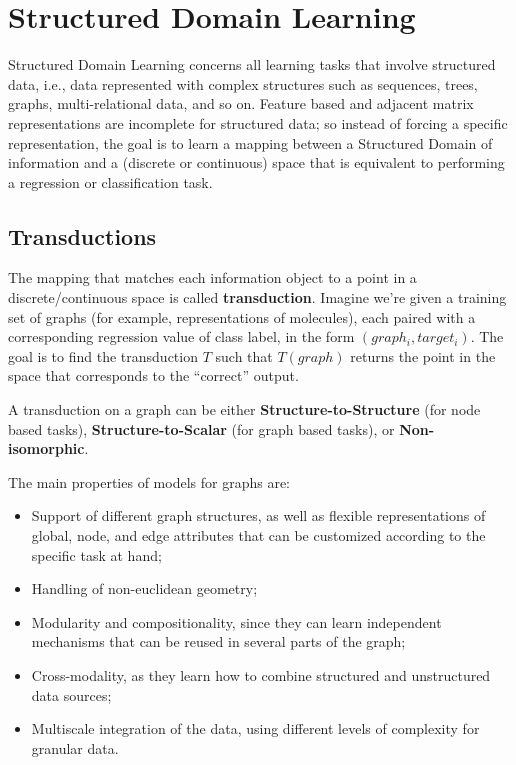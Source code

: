\chapter{Structured Domain Learning}

Structured Domain Learning concerns all learning tasks that involve structured data, i.e., data represented with complex structures such as sequences, trees, graphs, multi-relational data, and so on. Feature based and adjacent matrix representations are incomplete for structured data; so instead of forcing a specific representation, the goal is to learn a mapping between a Structured Domain of information and a (discrete or continuous) space that is equivalent to performing a regression or classification task.

\section{Transductions}

The mapping that matches each information object to a point in a discrete/continuous space is called \textbf{transduction}. Imagine we're given a training set of graphs (for example, representations of molecules), each paired with a corresponding regression value of class label, in the form $(graph_i, target_i)$. The goal is to find the transduction $T$ such that $T(graph)$ returns the point in the space that corresponds to the ``correct'' output.

A transduction on a graph can be either \textbf{Structure-to-Structure} (for node based tasks), \textbf{Structure-to-Scalar} (for graph based tasks), or \textbf{Non-isomorphic}.

The main properties of models for graphs are:
\begin{itemize}
    \item Support of different graph structures, as well as flexible representations of global, node, and edge attributes that can be customized according to the specific task at hand;
    \item Handling of non-euclidean geometry;
    \item Modularity and compositionality, since they can learn independent mechanisms that can be reused in several parts of the graph;
    \item Cross-modality, as they learn how to combine structured and unstructured data sources;
    \item Multiscale integration of the data, using different levels of complexity for granular data.
\end{itemize}

